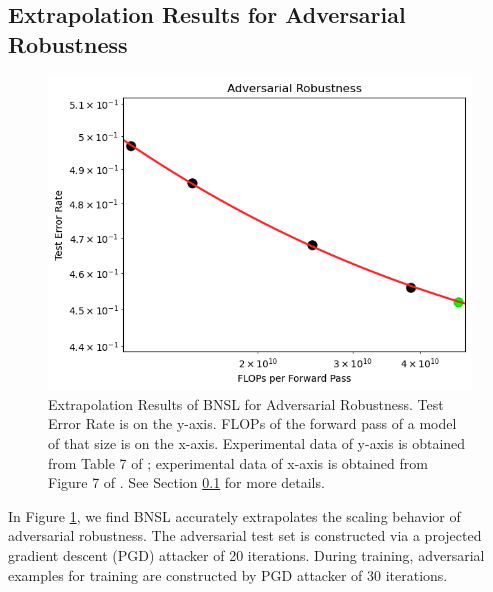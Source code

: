 \documentclass{article} %
\begin{document}
\clearpage

\subsection{Extrapolation Results for Adversarial Robustness}
\label{section:adversarial_robustness}

\vspace{-3.5mm}

\begin{figure}[htbp]
    \centering
\includegraphics[width=1.0\textwidth]{figures/adversarial_robustness/adversarial_robustness__pgd_20.png}
    \caption{
Extrapolation Results of BNSL for Adversarial Robustness. Test Error Rate is on the y-axis. FLOPs of the forward pass of a model of that size is on the x-axis. Experimental data of y-axis is obtained from Table 7 of \cite{Xie2020Intriguing}; experimental data of x-axis is obtained from Figure 7 of \cite{Xie2020Intriguing}. See Section \ref{section:adversarial_robustness} for more details.
    }
    \label{fig:adversarial_robustness}
\end{figure}

In Figure \ref{fig:adversarial_robustness}, we find BNSL accurately extrapolates the scaling behavior of adversarial robustness. The adversarial test set is constructed via a projected gradient descent (PGD) attacker \citep{madry2018towards} of 20 iterations. During training, adversarial examples for training are constructed by PGD attacker of 30 iterations.

\clearpage
\end{document}
